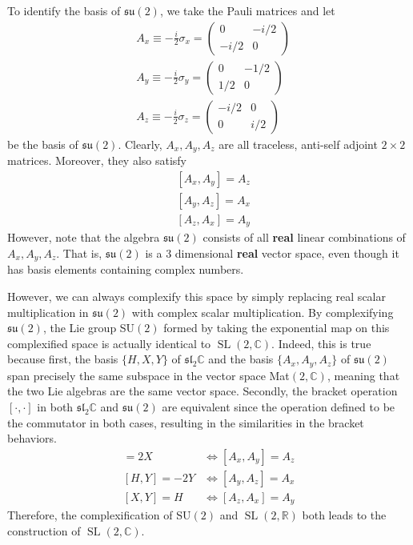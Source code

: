 \documentclass{article}
\DeclareMathOperator{\SL}{SL}
\begin{document}
      To identify the basis of $\mathfrak{su}(2)$, we take the Pauli matrices and let 
      \begin{align*}
        & A_x \equiv - \frac{i}{2} \sigma_x = \begin{pmatrix} 0&-i/2\\-i/2&0 \end{pmatrix} \\
        & A_y \equiv - \frac{i}{2} \sigma_y = \begin{pmatrix}0&-1/2\\1/2&0\end{pmatrix} \\
        & A_z \equiv -\frac{i}{2} \sigma_z = \begin{pmatrix}-i/2&0\\0&i/2\end{pmatrix}
      \end{align*} 
      be the basis of $\mathfrak{su}(2)$. Clearly, $A_x, A_y, A_z$ are all traceless, anti-self adjoint $2 \times 2$ matrices. Moreover, they also satisfy
      \begin{align*}
        & [A_x, A_y] = A_z \\
        & [A_y, A_z] = A_x \\
        & [A_z, A_x] = A_y
      \end{align*}
      However, note that the algebra $\mathfrak{su}(2)$ consists of all \textbf{real} linear combinations of $A_x, A_y, A_z$. That is, $\mathfrak{su}(2)$ is a 3 dimensional \textbf{real} vector space, even though it has basis elements containing complex numbers. 

      However, we can always complexify this space by simply replacing real scalar multiplication in $\mathfrak{su}(2)$ with complex scalar multiplication. By complexifying $\mathfrak{su}(2)$, the Lie group SU$(2)$ formed by taking the exponential map on this complexified space is actually identical to $\SL(2, \mathbb{C})$. Indeed, this is true because first, the basis $\{H, X, Y\}$ of $\mathfrak{sl}_2 \mathbb{C}$ and the basis $\{A_x, A_y, A_z\}$ of $\mathfrak{su}(2)$ span precisely the same subspace in the vector space Mat$(2, \mathbb{C})$, meaning that the two Lie algebras are the same vector space. Secondly, the bracket operation $[\cdot, \cdot]$ in both $\mathfrak{sl}_2 \mathbb{C}$ and $\mathfrak{su}(2)$ are equivalent since the operation defined to be the commutator in both cases, resulting in the similarities in the bracket behaviors. 
      \begin{align*}
        [H,X] = 2X & \iff [A_x, A_y] = A_z \\
        [H,Y] = - 2Y & \iff [A_y, A_z] = A_x\\
        [X,Y] = H & \iff  [A_z, A_x] = A_y 
      \end{align*}
      Therefore, the complexification of SU$(2)$ and $\SL(2, \mathbb{R})$ both leads to the construction of $\SL(2, \mathbb{C})$. 
\end{document}
